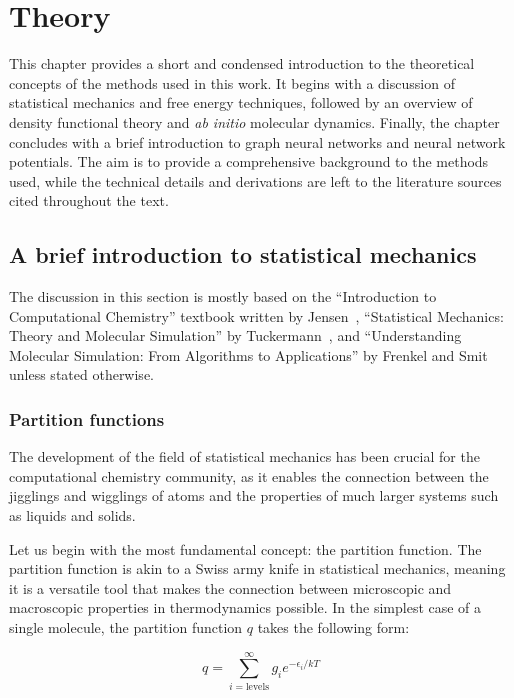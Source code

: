 \chapter{Theory}
This chapter provides a short and condensed introduction to the theoretical concepts of the methods used in this work. It begins with a discussion of statistical mechanics and free energy techniques, followed by an overview of density functional theory and \textit{ab initio} molecular dynamics. Finally, the chapter concludes with a brief introduction to graph neural networks and neural network potentials. The aim is to provide a comprehensive background to the methods used, while the technical details and derivations are left to the literature sources cited throughout the text.

\section{A brief introduction to statistical mechanics}
The discussion in this section is mostly based on the ``Introduction to Computational Chemistry'' textbook written by Jensen~\citep{jensenIntroductionComputationalChemistry2017}, ``Statistical Mechanics: Theory and Molecular Simulation'' by Tuckermann~\citep{tuckermanStatisticalMechanicsTheory2023}, and ``Understanding Molecular Simulation: From Algorithms to Applications'' by Frenkel and Smit~\citep{frenkelUnderstandingMolecularSimulation2002} unless stated otherwise.



\subsection{Partition functions}
The development of the field of statistical mechanics has been crucial for the computational chemistry community, as it enables the connection between the jigglings and wigglings of atoms and the properties of much larger systems such as liquids and solids.

Let us begin with the most fundamental concept: the partition function. The partition function is akin to a Swiss army knife in statistical mechanics, meaning it is a versatile tool that makes the connection between microscopic and macroscopic properties in thermodynamics possible. In the simplest case of a single molecule, the partition function $q$ takes the following form:

\begin{equation}
    q = \sum_{i = \text{levels}}^{\infty} g_i e^{-\epsilon_i/kT}
\end{equation}

